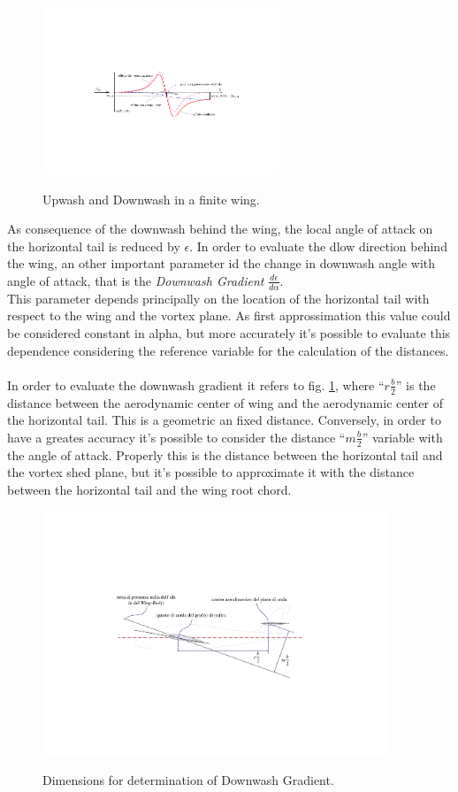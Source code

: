 \begin{figure}[H]
\centering
{\includegraphics[height=5cm]{Immagini/wing_upwash_downwash.pdf}} 
\caption{Upwash and Downwash in a finite wing.}
\end{figure}

As consequence of the downwash behind the wing, the local angle of attack on the horizontal tail is reduced by  $\epsilon$. In order to evaluate the dlow direction behind the wing, an other important parameter id the change in downwash angle with angle of attack, that is the {\itshape Downwash Gradient } $\frac{d\epsilon}{d\alpha}$.\\
This parameter depends principally on the location of the horizontal tail with respect to the wing and the vortex plane. As first approssimation this value could be considered constant in alpha, but more accurately it's possible to evaluate this dependence considering the reference variable for the calculation of the distances. \\ \\

In order to evaluate the downwash gradient it refers to fig. \ref{PerkinsDownwash}, where ``$r \frac{b}{2}$''  is the distance between the aerodynamic center of wing and the aerodynamic center of the horizontal tail. This is a geometric an fixed distance. Conversely,  in order to have a greates accuracy it's possible to consider the distance ``$m  \frac{b}{2}$'' variable with the angle of attack. Properly this is the distance between the horizontal tail and the vortex shed plane, but it's possible to approximate it with the distance between the horizontal tail and the wing root chord.

\begin{figure}[H]
\centering
{\includegraphics[height=7.3cm]{Immagini/wing_htail_Roskam.pdf}} 
\caption{Dimensions for determination of Downwash Gradient.}
\label{PerkinsDownwash}
\end{figure} 

